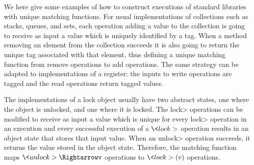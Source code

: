 



%
%

\begin{example}[Collections]

We here give some examples of how to construct executions of  
standard libraries with unique matching functions. 
For usual implementations of collections 
such as stacks, queues, and sets, 
each operation adding a value to the collection is going to 
receive as input a value which is uniquely identified by a tag. When a method removing 
an element from the collection succeeds 
it is also going to return the unique tag associated
with that element, thus defining a unique matching function
from remove operations to add operations. The same strategy can be adapted to 
implementations of a register: the inputs to write operations are tagged 
and the read operations return tagged values.

\end{example}

\begin{example}[Locks]

The implementations of a lock object usually have two abstract states, one where the
object is unlocked, and one where it is locked. 
The \<lock> operations can be modified to receive as input a value which is unique
for every \<lock> operation in an execution and every successful execution
of a $\<lock>$ operation results in an object state that stores that input value.
When
an \<unlock> operation succeeds, it returns the value stored in the object state.
Therefore, the matching function maps $\<unlock>\Rightarrowv$ operations to $\<lock>(v)$ operations.

\end{example}

